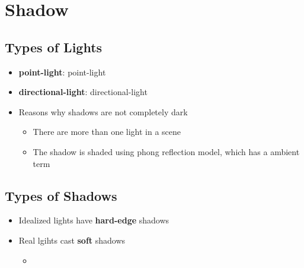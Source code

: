 \chapter{Shadow}

\section{Types of Lights}

  \begin{itemize}
    \item \textbf{\Gls{point-light}}: \glsdesc{point-light}
    \item \textbf{\Gls{directional-light}}: \glsdesc{directional-light}
    \item Reasons why shadows are not completely dark
    \begin{itemize}
      \item There are more than one light in a scene
      \item The shadow is shaded using phong reflection model, which has a
      ambient term
    \end{itemize}
  \end{itemize}

\section{Types of Shadows}

  \begin{itemize}
    \item Idealized lights have \textbf{hard-edge} shadows
    \item Real lgihts cast \textbf{soft} shadows
    \begin{itemize}
      \item
    \end{itemize}
  \end{itemize}

